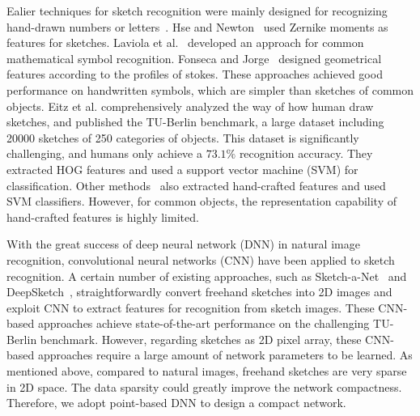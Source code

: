 %
Ealier techniques for sketch recognition were mainly designed for recognizing hand-drawn numbers or letters~\cite{Hse2004SketchedSR, LaViola2004MathPad2AS, Fonseca2000UsingFL}.
Hse and Newton~\cite{Hse2004SketchedSR} used Zernike moments as features for sketches.
Laviola et al.~\cite{LaViola2004MathPad2AS} developed an approach for common mathematical symbol recognition.
Fonseca and Jorge~\cite{Fonseca2000UsingFL} designed geometrical features according to the profiles of stokes.
These approaches achieved good performance on handwritten symbols, which are simpler than sketches of common objects.
%
Eitz et al. \cite{Eitz2012HowDH} comprehensively analyzed the way of how human draw sketches, and published the TU-Berlin benchmark, a large dataset including 20000 sketches of 250 categories of objects.
This dataset is significantly challenging, and humans only achieve a $73.1\%$ recognition accuracy.
%
They extracted HOG features and used a support vector machine (SVM) for classification.
Other methods~\cite{LiHSG15, Schneider2014SketchCA} also extracted hand-crafted features and used SVM classifiers.
However, for common objects, the representation capability of hand-crafted features is highly limited.



With the great success of deep neural network (DNN) in natural image recognition, convolutional neural networks (CNN) have been applied to sketch recognition.
A certain number of existing approaches, such as Sketch-a-Net~\cite{Yu2015SketchaNetTB} and DeepSketch~\cite{Seddati2015DeepSketchDC},
straightforwardly convert freehand sketches into 2D images and exploit CNN to extract features for recognition from sketch images.
These CNN-based approaches achieve state-of-the-art performance on the challenging TU-Berlin benchmark.
However, regarding sketches as 2D pixel array, these CNN-based approaches require a large amount of network parameters to be learned.
%
As mentioned above, compared to natural images, freehand sketches are very sparse in 2D space. The data sparsity could greatly improve the network compactness.
Therefore, we adopt point-based DNN to design a compact network.

